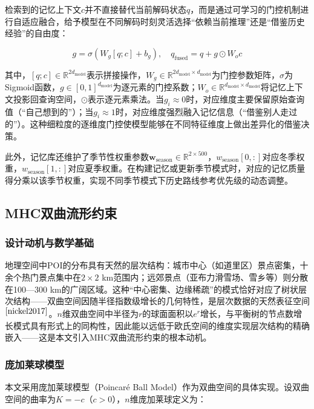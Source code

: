 \documentclass[12pt,a4paper]{ctexart}
\begin{document}
检索到的记忆上下文$c$并不直接替代当前解码状态$q$，而是通过可学习的门控机制进行自适应融合，给予模型在不同解码时刻灵活选择“依赖当前推理”还是“借鉴历史经验”的自由度：

\begin{equation}
g = \sigma\!\left(W_g[q;c] + b_g\right),\quad q_{\text{fused}} = q + g \odot W_o c
\label{eq:gate}
\end{equation}

其中，$[q;c]\in\mathbb{R}^{2d_{\text{model}}}$表示拼接操作，$W_g\in\mathbb{R}^{2d_{\text{model}}\times d_{\text{model}}}$为门控参数矩阵，$\sigma$为Sigmoid函数，$g\in[0,1]^{d_{\text{model}}}$为逐元素的门控系数；$W_o\in\mathbb{R}^{d_{\text{model}}\times d_{\text{model}}}$将记忆上下文投影回查询空间，$\odot$表示逐元素乘法。当$g_i\approx 0$时，对应维度主要保留原始查询值（“自己想到的”）；当$g_i\approx 1$时，对应维度强烈融入记忆信息（“借鉴别人走过的”）。这种细粒度的逐维度门控使模型能够在不同特征维度上做出差异化的借鉴决策。

此外，记忆库还维护了季节性权重参数$\boldsymbol{w}_{\text{season}}\in\mathbb{R}^{2\times 500}$，$w_{\text{season}}[0,:]$对应冬季权重，$w_{\text{season}}[1,:]$对应夏季权重。在构建记忆或更新季节模式时，对应的记忆质量得分乘以该季节权重，实现不同季节模式下历史路线参考优先级的动态调整。

\subsection{MHC双曲流形约束}

\subsubsection{设计动机与数学基础}

地理空间中POI的分布具有天然的层次结构：城市中心（如道里区）景点密集，十余个热门景点集中在$2\times2$ km范围内；远郊景点（亚布力滑雪场、雪乡等）则分散在100—300 km的广阔区域。这种“中心密集、边缘稀疏”的模式恰好对应了树状层次结构——双曲空间因随半径指数级增长的几何特性，是层次数据的天然表征空间$^{\cite{nickel2017}}$。$n$维双曲空间中半径为$r$的球面面积以$e^r$增长，与平衡树的节点数增长模式具有形式上的同构性，因此能以远低于欧氏空间的维度实现层次结构的精确嵌入——这是本文引入MHC双曲流形约束的根本动机。

\subsubsection{庞加莱球模型}

本文采用庞加莱球模型（Poincar\'{e} Ball Model）作为双曲空间的具体实现。设双曲空间的曲率为$K=-c$（$c>0$），$n$维庞加莱球定义为：
\end{document}
